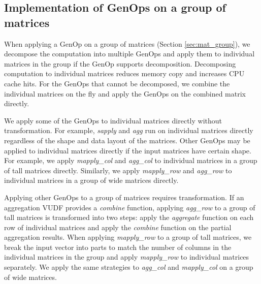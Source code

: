 \subsection{Implementation of GenOps on a group of matrices} \label{sec:group_op}

When applying a GenOp on a group of matrices (Section \ref{sec:mat_group}),
we decompose the computation into multiple GenOps and apply them to individual
matrices in the group if the GenOp supports decomposition. Decomposing computation
to individual matrices reduces memory copy and increases CPU cache hits.
For the GenOps that cannot be decomposed, we combine the individual matrices
on the fly and apply the GenOps on the combined matrix directly.

We apply some of the GenOps to individual matrices directly without
transformation. For example,
\textit{sapply} and \textit{agg} run on individual matrices directly regardless
of the shape and data layout of the matrices. Other GenOps may be applied
to individual matrices directly if the input matrices have certain shape. For
example, we apply \textit{mapply\_col} and \textit{agg\_col} to individual
matrices in a group of tall matrices directly.  Similarly, we apply
\textit{mapply\_row} and \textit{agg\_row} to
individual matrices in a group of wide matrices directly. %

Applying other GenOps to a group of matrices requires transformation. If an aggregation
VUDF provides a \textit{combine} function, applying \textit{agg\_row} to a group of
tall matrices is transformed into two steps: apply the \textit{aggregate} function on
each row of individual matrices and apply the \textit{combine} function on the partial
aggregation results. When applying \textit{mapply\_row} to a group of tall matrices,
we break the input vector into parts to match the number of columns in the individual
matrices in the group and apply \textit{mapply\_row} to individual matrices
separately. We apply the same strategies to \textit{agg\_col} and
\textit{mapply\_col} on a group of wide matrices. 

